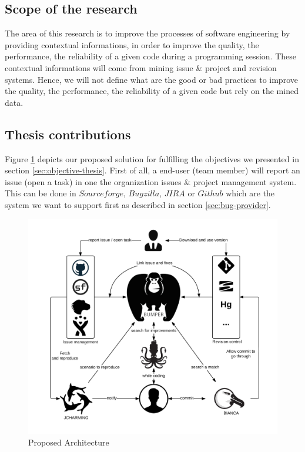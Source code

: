 \subsection{Scope of the research \label{sec:scope}}

The area of this research is to improve the processes of software engineering by providing contextual informations, in order to improve the quality, the performance, the reliability of a given code during a programming session. These contextual informations will come from mining issue \& project and revision systems. Hence, we will not define what are the good or bad practices to improve the quality, the performance, the reliability of a given code but rely on the mined data.

\subsection{Thesis contributions\label{sec:objective-thesis}}

Figure \ref{fig:proposal} depicts our proposed solution for fulfilling the objectives we presented in section \ref{sec:objective-thesis}.
First of all, a end-user (team member) will report an issue (open a task) in one the organization issues \& project management system. This can be done in $Sourceforge$, $Bugzilla$, $JIRA$ or $Github$ which are the system we want to support first as described in section \ref{sec:bug-provider}.

\begin{figure}[h!]
	\centering
	\includegraphics[scale=0.9]{media/proposal.png}
	\caption{Proposed Architecture}
	\label{fig:proposal}
\end{figure}


